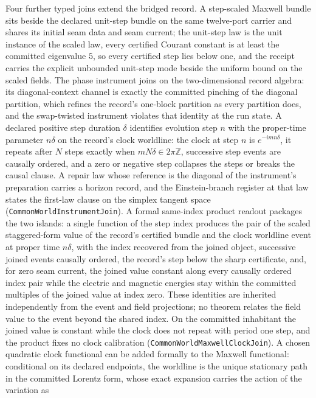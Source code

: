 \documentclass[11pt]{article}
\begin{document}
Four further typed joins extend the bridged record. A step-scaled Maxwell bundle
sits beside the declared unit-step bundle on the same twelve-port carrier and shares
its initial seam data and seam current; the unit-step law is the unit instance of the
scaled law, every certified Courant constant is at least the committed eigenvalue
\(5\), so every certified step lies below one, and the receipt carries the explicit
unbounded unit-step mode beside the uniform bound on the scaled fields. The phase
instrument joins on the two-dimensional record algebra: its diagonal-context channel
is exactly the committed pinching of the diagonal partition, which refines the
record's one-block partition as every partition does, and the swap-twisted
instrument violates that identity at the run state. A declared positive step
duration \(\delta\) identifies evolution step \(n\) with the proper-time parameter
\(n\delta\) on the record's clock worldline: the clock at step \(n\) is
\(e^{-imn\delta}\), it repeats after \(N\) steps exactly when
\(mN\delta\in 2\pi\mathbb{Z}\), successive step events are causally ordered, and a
zero or negative step collapses the steps or breaks the causal clause. A repair law
whose reference is the diagonal of the instrument's preparation carries a horizon
record, and the Einstein-branch register at that law states the first-law clause on
the simplex tangent space
(\texttt{CommonWorldInstrumentJoin}). A formal same-index
product readout packages the two islands: a single function of the step index produces the pair of
the scaled staggered-form value of the record's certified bundle and the
clock worldline event at proper time \(n\delta\), with the index recovered
from the joined object, successive joined events causally ordered, the
record's step below the sharp certificate, and, for zero seam current, the
joined value constant along every causally ordered index pair while the
electric and magnetic energies stay within the committed multiples of the
joined value at index zero. These identities are inherited independently
from the event and field projections; no theorem relates the field value to
the event beyond the shared index. On the committed inhabitant the joined
value is constant while the clock does not repeat with period one step, and
the product fixes no clock calibration
(\texttt{CommonWorldMaxwellClockJoin}). A chosen quadratic
clock functional can be added formally to the Maxwell functional: conditional
on its declared endpoints, the worldline is the unique stationary path in the committed
Lorentz form, whose exact expansion carries the action of the variation as
\end{document}
